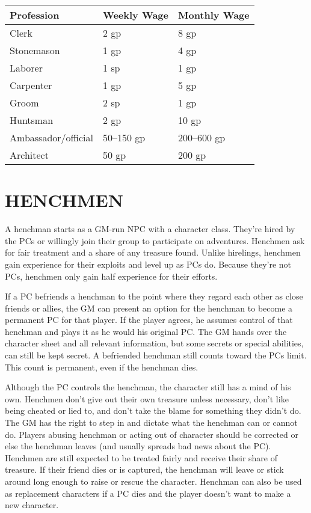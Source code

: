 \begin{multicols}{2}
\noindent
\begin{minipage}{\columnwidth}

\label{commonwages}
\noindent
\begin{tabular}{|m{}|m{}|m{}|}
\hline
Profession	& Weekly Wage	& Monthly Wage \\
\hline\hline
\rowcolor[gray]{.9}Clerk		& 2 gp	& 8 gp \\
Stonemason	& 1 gp	& 4 gp \\
\rowcolor[gray]{.9}Laborer		& 1 sp	& 1 gp \\
Carpenter	& 1 gp	& 5 gp \\
\rowcolor[gray]{.9}Groom		& 2 sp	& 1 gp \\
Huntsman	& 2 gp	& 10 gp \\
\rowcolor[gray]{.9}Ambassador/official	& 50--150 gp	& 200--600 gp \\
Architect	& 50 gp	& 200 gp \\
\hline
\end{tabular}

\end{minipage}

\section{HENCHMEN}

A henchman starts as a GM-run NPC with a character class.  They're hired by the PCs or willingly join their group to participate on adventures.  Henchmen ask for fair treatment and a share of any treasure found.  Unlike hirelings, henchmen gain experience for their exploits and level up as PCs do.  Because they're not PCs, henchmen only gain half experience for their efforts.

If a PC befriends a henchman to the point where they regard each other as close friends or allies, the GM can present an option for the henchman to become a permanent PC for that player.  If the player agrees, he assumes control of that henchman and plays it as he would his original PC.  The GM hands over the character sheet and all relevant information, but some secrets or special abilities, can still be kept secret.  A befriended henchman still counts toward the PCs limit.  This count is permanent, even if the henchman dies.

Although the PC controls the henchman, the character still has a mind of his own.  Henchmen don't give out their own treasure unless necessary, don't like being cheated or lied to, and don't take the blame for something they didn't do.  The GM has the right to step in and dictate what the henchman can or cannot do.  Players abusing henchman or acting out of character should be corrected or else the henchman leaves (and usually spreads bad news about the PC).  Henchmen are still expected to be treated fairly and receive their share of treasure.  If their friend dies or is captured, the henchman will leave or stick around long enough to raise or rescue the character.  Henchman can also be used as replacement characters if a PC dies and the player doesn't want to make a new character.


\end{multicols}
